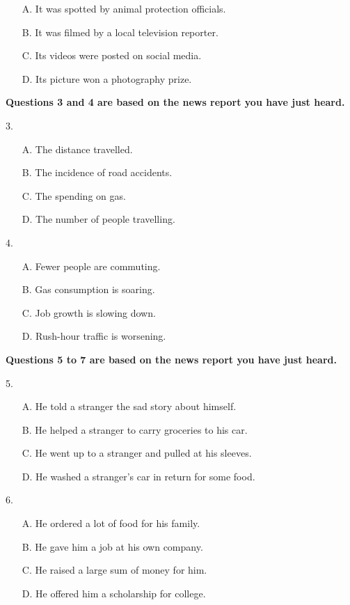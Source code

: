 \documentclass[UTF8,11pt]{ctexart}
\begin{document}
\begin{itemize}[leftmargin=2em,itemsep=.2em,topsep=.4em]\item[A.] It was spotted by animal protection officials.
\item[B.] It was filmed by a local television reporter.
\item[C.] Its videos were posted on social media.
\item[D.] Its picture won a photography prize.
\end{itemize}

\textbf{Questions 3 and 4 are based on the news report you have just heard.}


3.


\begin{itemize}[leftmargin=2em,itemsep=.2em,topsep=.4em]\item[A.] The distance travelled.
\item[B.] The incidence of road accidents.
\item[C.] The spending on gas.
\item[D.] The number of people travelling.
\end{itemize}

4.


\begin{itemize}[leftmargin=2em,itemsep=.2em,topsep=.4em]\item[A.] Fewer people are commuting.
\item[B.] Gas consumption is soaring.
\item[C.] Job growth is slowing down.
\item[D.] Rush-hour traffic is worsening.
\end{itemize}

\textbf{Questions 5 to 7 are based on the news report you have just heard.}


5.


\begin{itemize}[leftmargin=2em,itemsep=.2em,topsep=.4em]\item[A.] He told a stranger the sad story about himself.
\item[B.] He helped a stranger to carry groceries to his car.
\item[C.] He went up to a stranger and pulled at his sleeves.
\item[D.] He washed a stranger’s car in return for some food.
\end{itemize}

6.


\begin{itemize}[leftmargin=2em,itemsep=.2em,topsep=.4em]\item[A.] He ordered a lot of food for his family.
\item[B.] He gave him a job at his own company.
\item[C.] He raised a large sum of money for him.
\item[D.] He offered him a scholarship for college.
\end{itemize}
\end{document}
